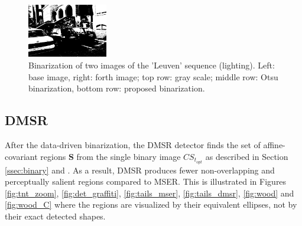 \documentclass[conference,compsoc]{IEEEtran}
\def\S{{\mathbf S}}
\begin{document}
\begin{figure}[htb]
\begin{minipage}[b]{0.48\linewidth}
\end{minipage}
\hfill
\begin{minipage}[b]{0.48\linewidth}
  \centering
  \centerline{\includegraphics[width=3.5cm]{leuven4_numcc}}
\end{minipage}

\caption{Binarization of two images of the 'Leuven' sequence (lighting). Left: base image, right: forth image;   top row: gray scale; middle row: Otsu binarization, bottom row: proposed binarization.}
\label{fig:leuven_bin}
%
\end{figure}

\subsection{DMSR}
After the data-driven binarization, the DMSR detector finds the set of affine-covariant regions $\S$ from the single binary image $CS_{t_{opt}}$ as described in Section \ref{ssec:binary} and \cite{RangMSSR06, RangHumpb06}. As a result, DMSR produces fewer non-overlapping and perceptually salient regions compared to MSER. This is illustrated in Figures \ref{fig:tnt_zoom}, \ref{fig:det_graffiti}, \ref{fig:tails_mser}, \ref{fig:tails_dmsr}, \ref{fig:wood} and \ref{fig:wood_C} where the regions are visualized by their equivalent ellipses, not by their exact detected shapes.
\end{document}
